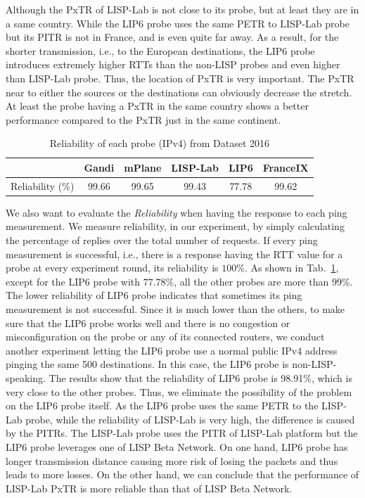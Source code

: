 Although the PxTR of LISP-Lab is not close to its probe, but at least they are in a same country. While the LIP6 probe uses the same PETR to LISP-Lab probe but its PITR is not in France, and is even quite far away. As a result, for the shorter transmission, i.e., to the European destinations, the LIP6 probe introduces extremely higher RTTs than the non-LISP probes and even higher than LISP-Lab probe. Thus, the location of PxTR is very important. The PxTR near to either the sources or the destinations can obviously decrease the stretch. At least the probe having a PxTR in the same country shows a better performance compared to the PxTR just in the same continent.

\begin{table}[!tb]
	\centering
	\caption{Reliability of each probe (IPv4) from Dataset 2016}
	\label{reliability_v4_2016}{
		\begin{tabular}{@{}c|c|c|c|c|c@{}}
			\hline\hline
			& Gandi  & mPlane  & LISP-Lab  & LIP6 &  FranceIX \\ \hline
			Reliability (\%) &  99.66 & 99.65 & 99.43 & 77.78 & 99.62     	\\  \hline\hline                 
		\end{tabular}
	}
\end{table}


We also want to evaluate the \emph{Reliability} when having the response to each ping measurement. We measure reliability, in our experiment, by simply calculating the percentage of replies over the total number of requests. If every ping measurement is successful, i.e., there is a response having the RTT value for a probe at every experiment round, its reliability is $100\%$. As shown in Tab.~\ref{reliability_v4_2016}, except for the LIP6 probe with $77.78\%$, all the other probes are more than $99\%$. The lower reliability of LIP6 probe indicates that sometimes its ping measurement is not successful. Since it is much lower than the others, to make sure that the LIP6 probe works well and there is no congestion or misconfiguration on the probe or any of its connected routers, we conduct another experiment letting the LIP6 probe use a normal public IPv4 address pinging the same 500 destinations. In this case, the LIP6 probe is non-LISP-speaking. The results show that the reliability of LIP6 probe is 98.91\%, which is very close to the other probes. Thus, we eliminate the possibility of the problem on the LIP6 probe itself. As the LIP6 probe uses the same PETR to the LISP-Lab probe, while the reliability of LISP-Lab is very high, the difference is caused by the PITRs. The LISP-Lab probe uses the PITR of LISP-Lab platform but the LIP6 probe leverages one of LISP Beta Network. On one hand, LIP6 probe has longer transmission distance causing more risk of losing the packets and thus leads to more losses. On the other hand, we can conclude that the performance of LISP-Lab PxTR is more reliable than that of LISP Beta Network.

